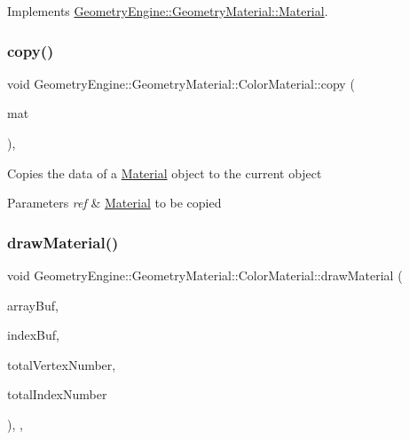 Implements \mbox{\hyperlink{class_geometry_engine_1_1_geometry_material_1_1_material_ae5513ff06d536365e18ddc5e07e79784}{Geometry\+Engine\+::\+Geometry\+Material\+::\+Material}}.

\mbox{\label{class_geometry_engine_1_1_geometry_material_1_1_color_material_a11ddb849641dc6216d7ded2331636d46}} 
\subsubsection{\texorpdfstring{copy()}{copy()}}
{\footnotesize\ttfamily void Geometry\+Engine\+::\+Geometry\+Material\+::\+Color\+Material\+::copy (\begin{DoxyParamCaption}\item[{const \mbox{\hyperlink{class_geometry_engine_1_1_geometry_material_1_1_color_material}{Color\+Material}} \&}]{mat }\end{DoxyParamCaption})\hspace{0.3cm}{\ttfamily [protected]}, {\ttfamily [virtual]}}

Copies the data of a \mbox{\hyperlink{class_geometry_engine_1_1_geometry_material_1_1_material}{Material}} object to the current object 
\begin{DoxyParams}{Parameters}
{\em ref} & \mbox{\hyperlink{class_geometry_engine_1_1_geometry_material_1_1_material}{Material}} to be copied \\
\hline
\end{DoxyParams}
\mbox{\label{class_geometry_engine_1_1_geometry_material_1_1_color_material_abaf6f7ed79dad79253ea469c4c7460eb}} 
\subsubsection{\texorpdfstring{drawMaterial()}{drawMaterial()}}
{\footnotesize\ttfamily void Geometry\+Engine\+::\+Geometry\+Material\+::\+Color\+Material\+::draw\+Material (\begin{DoxyParamCaption}\item[{Q\+Open\+G\+L\+Buffer $\ast$}]{array\+Buf,  }\item[{Q\+Open\+G\+L\+Buffer $\ast$}]{index\+Buf,  }\item[{unsigned int}]{total\+Vertex\+Number,  }\item[{unsigned int}]{total\+Index\+Number }\end{DoxyParamCaption})\hspace{0.3cm}{\ttfamily [override]}, {\ttfamily [protected]}, {\ttfamily [virtual]}}

